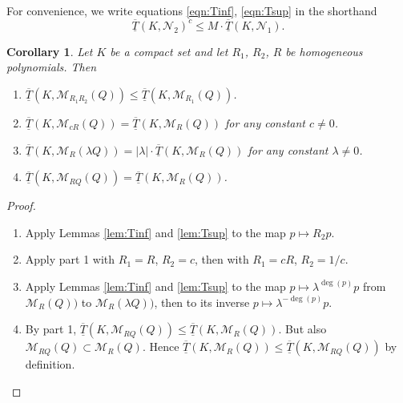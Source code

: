 \documentclass[12pt]{article}
\numberwithin{equation}{section}
\newtheorem{corollary}[theorem]{Corollary}
\newcommand{\calM}{\mathcal{M}}
\newcommand{\calN}{\mathcal{N}}
\begin{document}
For convenience, we write equations \eqref{eqn:Tinf}, \eqref{eqn:Tsup} in the shorthand 
$$
\overline{\underline T}(K,\calN_2)^c \leq M\cdot\overline{\underline T}(K,\calN_1).
$$

\begin{corollary}\label{cor:3}
Let $K$ be a compact set and let $R_1$, $R_2$, $R$ be homogeneous polynomials. Then 
\begin{enumerate}
\item $\overline{\underline T}(K,\calM_{R_1R_2}(Q))\leq \overline{\underline T}(K,\calM_{R_1}(Q))$.
\item $\overline{\underline T}(K,\calM_{cR}(Q))= \overline{\underline T}(K,\calM_{R}(Q))$ for any constant $c\neq 0$.
\item $\overline{\underline T}(K,\calM_{R}(\lambda Q))= |\lambda|\cdot\overline{\underline T}(K,\calM_{R}(Q))$ for any constant $\lambda\neq 0$.
\item $\overline{\underline T}(K,\calM_{RQ}(Q)) = \overline{\underline T}(K,\calM_{R}(Q))$.
\end{enumerate}
\end{corollary}

\begin{proof}
\begin{enumerate}
\item Apply Lemmas \ref{lem:Tinf} and \ref{lem:Tsup} to the map $p\mapsto R_2p$.
\item Apply part 1 with $R_1=R$, $R_2=c$, then with $R_1= cR$, $R_2=1/c$.  
\item Apply Lemmas \ref{lem:Tinf} and \ref{lem:Tsup} to the map $p\mapsto\lambda^{\deg(p)}p$ from $\calM_{R}(Q))$ to $\calM_{R}(\lambda Q))$, then to its inverse  $p\mapsto\lambda^{-\deg(p)}p$. 
\item By part 1, $\overline{\underline T}(K,\calM_{RQ}(Q)) \leq \overline{\underline T}(K,\calM_{R}(Q))$.  
But also $\calM_{RQ}(Q)\subset\calM_{R}(Q)$.   Hence 
$\overline{\underline T}(K,\calM_{R}(Q)) \leq \overline{\underline T}(K,\calM_{RQ}(Q))$  by definition. \end{enumerate} \end{proof}
\end{document}
